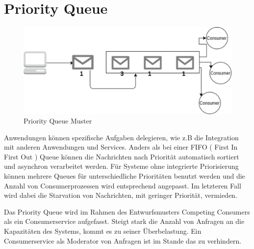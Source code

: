 \documentclass[
12pt,
english,
ngerman,
headsepline,
twoside,
openright,
numbers=noenddot,version=first
]{scrreprt}
\begin{document}
\section{Priority Queue}\label{sec:priority-queue}
\begin{figure}[h]
	\centering
	\includegraphics[scale=0.60]{./pics/pattern-priority-queue.eps}
	\caption{Priority Queue Muster}
	\label{pic:priority-queue}
\end{figure}
Anwendungen können spezifische Aufgaben delegieren, wie z.B die Integration mit anderen Anwendungen und Services. Anders als bei einer FIFO  ( First In First Out ) Queue können die Nachrichten nach Priorität automatisch sortiert und asynchron verarbeitet werden. Für Systeme ohne integrierte Priorisierung können mehrere Queues für unterschiedliche Prioritäten benutzt werden und die Anzahl von Consumerprozessen wird entsprechend angepasst. Im letzteren Fall wird dabei die Starvation von Nachrichten, mit geringer Priorität, vermieden.

Das Priority Queue wird im Rahmen des Entwurfsmusters Competing Consumers als ein Consumerservice aufgefasst. Steigt stark die Anzahl von Anfragen an die Kapazitäten des Systems, kommt es zu seiner Überbelastung. Ein Consumerservice als Moderator von Anfragen ist im Stande das zu verhindern.
\end{document}
